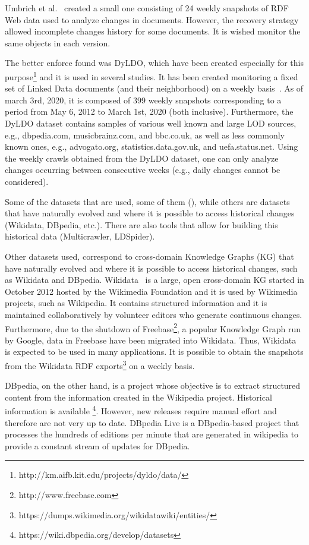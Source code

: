 \documentclass[sw]{iosart2x}
\begin{document}
Umbrich et al.~\cite{UmbrichHHPD10} created a small one consisting of 24 weekly snapshots of RDF Web data used to analyze changes in documents. However, the recovery strategy allowed incomplete changes history for some documents. It is wished monitor the same objects in each version.

The better enforce found was DyLDO, which have been created especially for this purpose\footnote{http://km.aifb.kit.edu/projects/dyldo/data/} and it is used in several studies. It has been created monitoring a fixed set of Linked Data documents (and their neighborhood) on a weekly basis~\cite{KaferUHP12, KaferAUOH13}. As of march 3rd, 2020, it is composed of 399 weekly snapshots corresponding to a period from May 6, 2012 to March 1st, 2020 (both inclusive). Furthermore, the DyLDO dataset contains samples of various well known and large LOD sources, e.g., dbpedia.com, musicbrainz.com, and bbc.co.uk, as well as less commonly known ones, e.g., advogato.org, statistics.data.gov.uk, and uefa.status.net. Using the weekly crawls obtained from the DyLDO dataset, one can only analyze changes occurring between consecutive weeks (e.g., daily changes cannot be considered).

Some of the datasets that are used, some of them  (), while others are datasets that have naturally evolved and where it is possible to access historical changes (Wikidata, DBpedia, etc.). There are also tools that allow for building this historical data (Multicrawler, LDSpider).

Other datasets used, correspond to cross-domain Knowledge Graphs (KG) that have naturally evolved and where it is possible to access historical changes, such as Wikidata and DBpedia. Wikidata~\cite{VrandecicK14} is a large, open cross-domain KG started in October 2012 hosted by the Wikimedia Foundation and it is used by Wikimedia projects, such as Wikipedia. It contains structured information and it is maintained collaboratively by volunteer editors who generate continuous changes. Furthermore, due to the shutdown of Freebase\footnote{http://www.freebase.com}, a popular Knowledge Graph run by Google, data in Freebase have been migrated into Wikidata. Thus, Wikidata is expected to be used in many applications. It is possible to obtain the snapshots from the Wikidata RDF exports\footnote{https://dumps.wikimedia.org/wikidatawiki/entities/} on a weekly basis. 

DBpedia, on the other hand, is a project whose objective is to extract structured content from the information created in the Wikipedia project. Historical information is available \footnote{https://wiki.dbpedia.org/develop/datasets}. However, new releases require manual effort and therefore are not very up to date. DBpedia Live is a DBpedia-based project that processes the hundreds of editions per minute that are generated in wikipedia to provide a constant stream of updates for DBpedia. 
\end{document}
